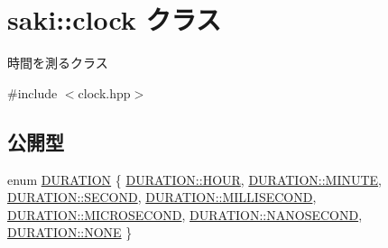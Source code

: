 \hypertarget{classsaki_1_1clock}{}\section{saki\+:\+:clock クラス}
\label{classsaki_1_1clock}


時間を測るクラス  




{\ttfamily \#include $<$clock.\+hpp$>$}

\subsection*{公開型}
\begin{DoxyCompactItemize}
\item 
enum \mbox{\hyperlink{classsaki_1_1clock_a33900ca0b3320bafb061928ad6827bdf}{D\+U\+R\+A\+T\+I\+ON}} \{ \newline
\mbox{\hyperlink{classsaki_1_1clock_a33900ca0b3320bafb061928ad6827bdfadd3f965174e8bb2f64523981626ced1a}{D\+U\+R\+A\+T\+I\+O\+N\+::\+H\+O\+UR}}, 
\mbox{\hyperlink{classsaki_1_1clock_a33900ca0b3320bafb061928ad6827bdfa46bda4cde2f10bdb9e51e3bbefa4a2bf}{D\+U\+R\+A\+T\+I\+O\+N\+::\+M\+I\+N\+U\+TE}}, 
\mbox{\hyperlink{classsaki_1_1clock_a33900ca0b3320bafb061928ad6827bdfa2200becb80f0019c4a2ccecec350d0db}{D\+U\+R\+A\+T\+I\+O\+N\+::\+S\+E\+C\+O\+ND}}, 
\mbox{\hyperlink{classsaki_1_1clock_a33900ca0b3320bafb061928ad6827bdfa241d7907de05ad50c011812e927cd671}{D\+U\+R\+A\+T\+I\+O\+N\+::\+M\+I\+L\+L\+I\+S\+E\+C\+O\+ND}}, 
\newline
\mbox{\hyperlink{classsaki_1_1clock_a33900ca0b3320bafb061928ad6827bdfa52a3ae8e5d772e28d4e2105fefd2eed1}{D\+U\+R\+A\+T\+I\+O\+N\+::\+M\+I\+C\+R\+O\+S\+E\+C\+O\+ND}}, 
\mbox{\hyperlink{classsaki_1_1clock_a33900ca0b3320bafb061928ad6827bdfaeb8c6d69310ffef899148b680e672652}{D\+U\+R\+A\+T\+I\+O\+N\+::\+N\+A\+N\+O\+S\+E\+C\+O\+ND}}, 
\mbox{\hyperlink{classsaki_1_1clock_a33900ca0b3320bafb061928ad6827bdfab50339a10e1de285ac99d4c3990b8693}{D\+U\+R\+A\+T\+I\+O\+N\+::\+N\+O\+NE}}
 \}
\end{DoxyCompactItemize}
